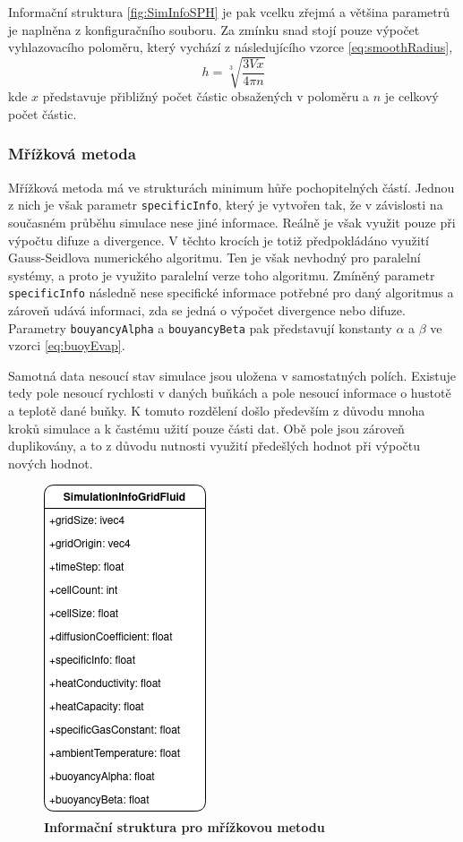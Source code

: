 \newpage

Informační struktura \ref{fig:SimInfoSPH} je pak vcelku zřejmá a většina parametrů je naplněna z konfiguračního souboru. Za zmínku snad stojí pouze výpočet vyhlazovacího poloměru, který vychází z následujícího vzorce \ref{eq:smoothRadius},
\begin{equation}
    h=\sqrt[3]{\frac{3 V x}{4 \pi n}}
    \label{eq:smoothRadius}
\end{equation}
kde $x$ představuje přibližný počet částic obsažených v poloměru a $n$ je celkový počet částic.


\subsubsection{Mřížková metoda}
Mřížková metoda má ve strukturách minimum hůře pochopitelných částí. Jednou z nich je však parametr \texttt{specificInfo}, který je vytvořen tak, že v závislosti na současném průběhu simulace nese jiné informace. Reálně je však využit pouze při výpočtu difuze a divergence. V těchto krocích je totiž předpokládáno využití Gauss-Seidlova numerického algoritmu. Ten je však nevhodný pro paralelní systémy, a proto je využito paralelní verze toho algoritmu. Zmíněný parametr \texttt{specificInfo} následně nese specifické informace potřebné pro daný algoritmus a zároveň udává informaci, zda se jedná o výpočet divergence nebo difuze. Parametry \texttt{bouyancyAlpha} a \texttt{bouyancyBeta} pak představují konstanty $\alpha$ a $\beta$ ve vzorci \ref{eq:buoyEvap}.

Samotná data nesoucí stav simulace jsou uložena v samostatných polích. Existuje tedy pole nesoucí rychlosti v daných buňkách a pole nesoucí informace o hustotě a teplotě dané buňky. K tomuto rozdělení došlo především z důvodu mnoha kroků simulace a k častému užití pouze části dat. Obě pole jsou zároveň duplikovány, a to z důvodu nutnosti využití předešlých hodnot při výpočtu nových hodnot. 

\begin{figure}[hbt]
	\centering
	\captionsetup{justification=centering}
	\includegraphics[scale=0.6]{obrazky-figures/SimulationInfoGridFluid.png}
	\caption{\textbf{Informační struktura pro mřížkovou metodu}}
	\label{fig:structsGrid}
\end{figure}

